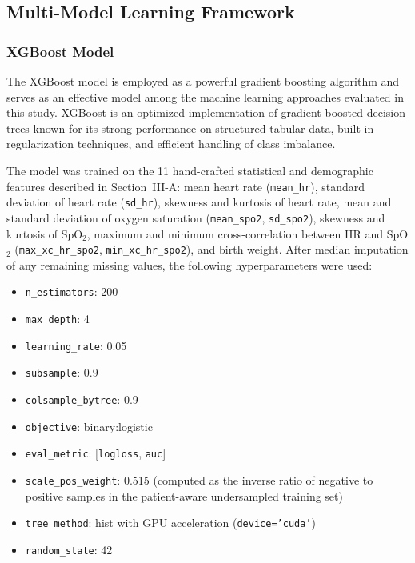 \documentclass[conference]{IEEEtran}
\begin{document}
\subsection{Multi-Model Learning Framework}

\subsubsection{XGBoost Model}



The XGBoost model is employed as a powerful gradient boosting algorithm and serves as an effective model among the machine learning approaches evaluated in this study. XGBoost is an optimized implementation of gradient boosted decision trees known for its strong performance on structured tabular data, built-in regularization techniques, and efficient handling of class imbalance.

The model was trained on the 11 hand-crafted statistical and demographic features described in Section~III-A: mean heart rate (\texttt{mean\_hr}), standard deviation of heart rate (\texttt{sd\_hr}), skewness and kurtosis of heart rate, mean and standard deviation of oxygen saturation (\texttt{mean\_spo2}, \texttt{sd\_spo2}), skewness and kurtosis of SpO$_2$, maximum and minimum cross-correlation between HR and SpO$_2$ (\texttt{max\_xc\_hr\_spo2}, \texttt{min\_xc\_hr\_spo2}), and birth weight. After median imputation of any remaining missing values, the following hyperparameters were used:

\begin{itemize}
    \item \texttt{n\_estimators}: 200
    \item \texttt{max\_depth}: 4
    \item \texttt{learning\_rate}: 0.05
    \item \texttt{subsample}: 0.9
    \item \texttt{colsample\_bytree}: 0.9
    \item \texttt{objective}: binary:logistic
    \item \texttt{eval\_metric}: [\texttt{logloss}, \texttt{auc}]
    \item \texttt{scale\_pos\_weight}: 0.515 (computed as the inverse ratio of negative to positive samples in the patient-aware undersampled training set)
    \item \texttt{tree\_method}: hist with GPU acceleration (\texttt{device='cuda'})
    \item \texttt{random\_state}: 42
\end{itemize}
\end{document}
